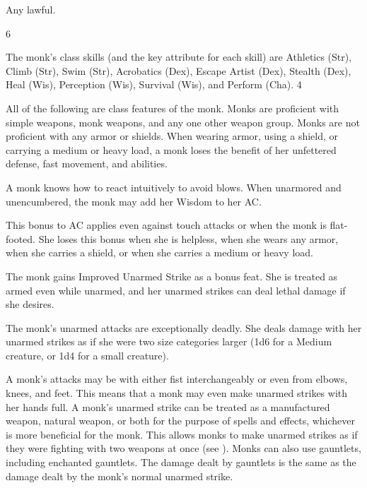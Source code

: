  Any lawful.

 6

The monk's class skills (and the key attribute for each skill) are Athletics (Str), Climb (Str), Swim (Str), Acrobatics (Dex), Escape Artist (Dex), Stealth (Dex), Heal (Wis), Perception (Wis), Survival (Wis), and Perform (Cha).
 4

All of the following are class features of the monk.
Monks are proficient with simple weapons, monk weapons, and any one other weapon group. Monks are not proficient with any armor or shields. When wearing armor, using a shield, or carrying a medium or heavy load, a monk loses the benefit of her unfettered defense, fast movement, and \ki abilities.

 A monk knows how to react intuitively to avoid blows. When unarmored and unencumbered, the monk may add her Wisdom to her AC.

\par This bonus to AC applies even against touch attacks or when the monk is flat-footed. She loses this bonus when she is helpless, when she wears any armor, when she carries a shield, or when she carries a medium or heavy load.

\begin{comment}  %
 \cfnl{\Ki Ward (Ex)}\label{Mnk:Ki Ward (Ex)} When unarmored and unencumbered, a monk gains a \plus1 armor bonus to AC at 2nd level. This bonus increases by 1 for every two monk levels thereafter (\plus2 at 4th, \plus3 at 6th, etc.).

\par The monk loses this bonus when she is
immobilized or helpless, when she wears any armor, when she carries a shield, or when she carries a medium or heavy load.
\end{comment}

 The monk gains Improved Unarmed Strike as a bonus feat. She is treated as armed even while unarmed, and her unarmed strikes can deal lethal damage if she desires.

 The monk's unarmed attacks are exceptionally deadly. She deals damage with her unarmed strikes as if she were two size categories larger (1d6 for a Medium creature, or 1d4 for a small creature).

A monk's attacks may be with either fist interchangeably or even from elbows, knees, and feet. This means that a monk may even make unarmed strikes with her hands full. A monk's unarmed strike can be treated as a manufactured weapon, natural weapon, or both for the purpose of spells and effects, whichever is more beneficial for the monk. This allows monks to make unarmed strikes as if they were fighting with two weapons at once (see ). Monks can also use gauntlets, including enchanted gauntlets. The damage dealt by gauntlets is the same as the damage dealt by the monk's normal unarmed strike.

